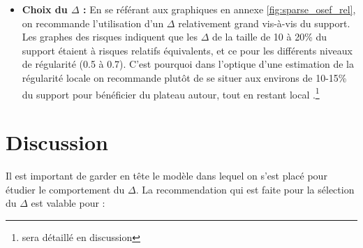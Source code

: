 \begin{itemize}
\bigskip

\item \textbf{Choix du $\Delta$ : } En se référant aux graphiques en annexe \ref{fig:sparse_osef_rel}, on recommande l'utilisation d'un $\Delta$ relativement grand vis-à-vis du support. Les graphes des risques indiquent que les $\Delta$ de la taille de 10 à 20\% du support étaient à risques relatifs équivalents, et ce pour les différents niveaux de régularité (0.5 à 0.7). C'est pourquoi dans l'optique d'une estimation de la régularité \og locale \fg on recommande plutôt de se situer aux environs de 10-15\% du support pour bénéficier du plateau autour, tout en restant \og local \fg.\footnote{sera détaillé en discussion}

\end{itemize}

\section{Discussion}
\label{sec:methodo_discussion}

Il est important de garder en tête le modèle dans lequel on s'est placé pour étudier le comportement du $\Delta$. La recommendation qui est faite pour la sélection du $\Delta$ est valable pour :


